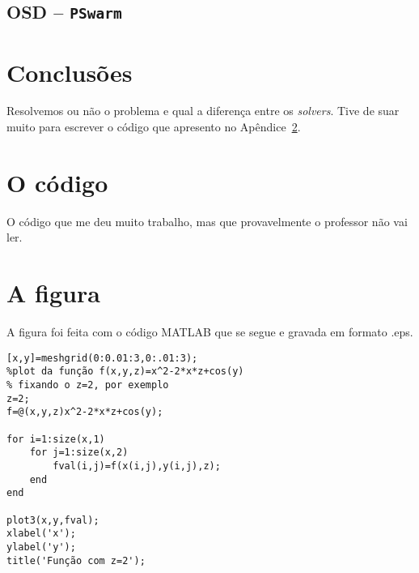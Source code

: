 \documentclass[a4paper,12pt]{article}
\begin{document}
\subsection{OSD -- {\tt PSwarm}}


\section{Conclusões}\label{sc:conc}

Resolvemos ou não o problema e qual a diferença entre os \emph{solvers}. Tive de suar muito para escrever o código que apresento no Apêndice~\ref{A:1}.



\appendix

\section{O código}\label{A:1}

O código que me deu muito trabalho, mas que provavelmente o professor não vai ler.

\section{A figura}\label{A:2}

A figura foi feita com o código MATLAB que se segue e gravada em formato .eps.

\begin{verbatim}
[x,y]=meshgrid(0:0.01:3,0:.01:3);
%plot da função f(x,y,z)=x^2-2*x*z+cos(y)
% fixando o z=2, por exemplo
z=2;
f=@(x,y,z)x^2-2*x*z+cos(y);

for i=1:size(x,1)
    for j=1:size(x,2)
        fval(i,j)=f(x(i,j),y(i,j),z);
    end
end

plot3(x,y,fval);
xlabel('x');
ylabel('y');
title('Função com z=2');
\end{verbatim}




\end{document}
